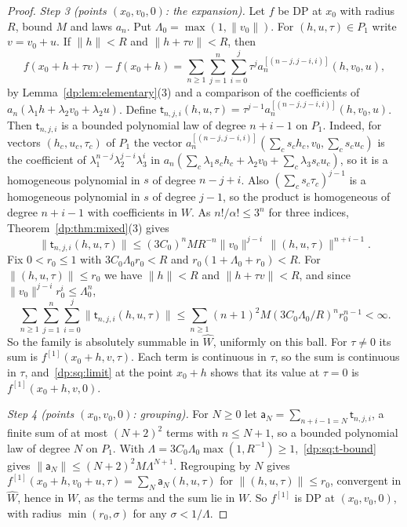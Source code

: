 \documentclass[11pt]{amsart}
\theoremstyle{definition}
\theoremstyle{remark}
\numberwithin{equation}{section}
\newcommand{\norm}[1]{\lVert #1\rVert}
\theoremstyle{plain}
\theoremstyle{definition}
\theoremstyle{plain}
\begin{document}
\begin{proof}
\emph{Step 3 (points $(x_0,v_0,0)$: the expansion).} Let $f$ be DP at $x_0$ with radius $R$, bound $M$ and laws $a_n$. Put $\Lambda_0=\max(1,\norm{v_0})$. For $(h,u,\tau)\in P_1$ write $v=v_0+u$. If $\norm h<R$ and $\norm{h+\tau v}<R$, then
\[
 f(x_0+h+\tau v)-f(x_0+h)=\sum_{n\ge1}\sum_{j=1}^n\sum_{i=0}^j\tau^ja_n^{[(n-j,j-i,i)]}(h,v_0,u),
\]
by Lemma~\ref{dp:lem:elementary}(3) and a comparison of the coefficients of $a_n(\lambda_1h+\lambda_2v_0+\lambda_2u)$. Define $\mathsf t_{n,j,i}(h,u,\tau)=\tau^{j-1}a_n^{[(n-j,j-i,i)]}(h,v_0,u)$. Then $\mathsf t_{n,j,i}$ is a bounded polynomial law of degree $n+i-1$ on $P_1$. Indeed, for vectors $(h_c,u_c,\tau_c)$ of $P_1$ the vector $a_n^{[(n-j,j-i,i)]}(\sum_cs_ch_c,v_0,\sum_cs_cu_c)$ is the coefficient of $\lambda_1^{n-j}\lambda_2^{j-i}\lambda_3^i$ in $a_n(\sum_c\lambda_1s_ch_c+\lambda_2v_0+\sum_c\lambda_3s_cu_c)$, so it is a homogeneous polynomial in $s$ of degree $n-j+i$. Also $(\sum_cs_c\tau_c)^{j-1}$ is a homogeneous polynomial in $s$ of degree $j-1$, so the product is homogeneous of degree $n+i-1$ with coefficients in $W$. As $n!/\alpha!\le3^n$ for three indices, Theorem~\ref{dp:thm:mixed}(3) gives
\begin{equation}\label{dp:sq:t-bound}
 \norm{\mathsf t_{n,j,i}(h,u,\tau)}\le(3C_0)^nMR^{-n}\norm{v_0}^{j-i}\,\norm{(h,u,\tau)}^{n+i-1}.
\end{equation}
Fix $0<r_0\le1$ with $3C_0\Lambda_0r_0<R$ and $r_0(1+\Lambda_0+r_0)<R$. For $\norm{(h,u,\tau)}\le r_0$ we have $\norm h<R$ and $\norm{h+\tau v}<R$, and since $\norm{v_0}^{j-i}r_0^i\le\Lambda_0^n$,
\[
 \sum_{n\ge1}\sum_{j=1}^n\sum_{i=0}^j\norm{\mathsf t_{n,j,i}(h,u,\tau)}\le\sum_{n\ge1}(n+1)^2M(3C_0\Lambda_0/R)^nr_0^{n-1}<\infty.
\]
So the family is absolutely summable in $\widehat W$, uniformly on this ball. For $\tau\ne0$ its sum is $f^{[1]}(x_0+h,v,\tau)$. Each term is continuous in $\tau$, so the sum is continuous in $\tau$, and~\eqref{dp:sq:limit} at the point $x_0+h$ shows that its value at $\tau=0$ is $f^{[1]}(x_0+h,v,0)$.

\emph{Step 4 (points $(x_0,v_0,0)$: grouping).} For $N\ge0$ let $\mathsf a_N=\sum_{n+i-1=N}\mathsf t_{n,j,i}$, a finite sum of at most $(N+2)^2$ terms with $n\le N+1$, so a bounded polynomial law of degree $N$ on $P_1$. With $\Lambda=3C_0\Lambda_0\max(1,R^{-1})\ge1$,~\eqref{dp:sq:t-bound} gives $\norm{\mathsf a_N}\le(N+2)^2M\Lambda^{N+1}$. Regrouping by $N$ gives $f^{[1]}(x_0+h,v_0+u,\tau)=\sum_N\mathsf a_N(h,u,\tau)$ for $\norm{(h,u,\tau)}\le r_0$, convergent in $\widehat W$, hence in $W$, as the terms and the sum lie in $W$. So $f^{[1]}$ is DP at $(x_0,v_0,0)$, with radius $\min(r_0,\sigma)$ for any $\sigma<1/\Lambda$.


\end{proof}
\end{document}
